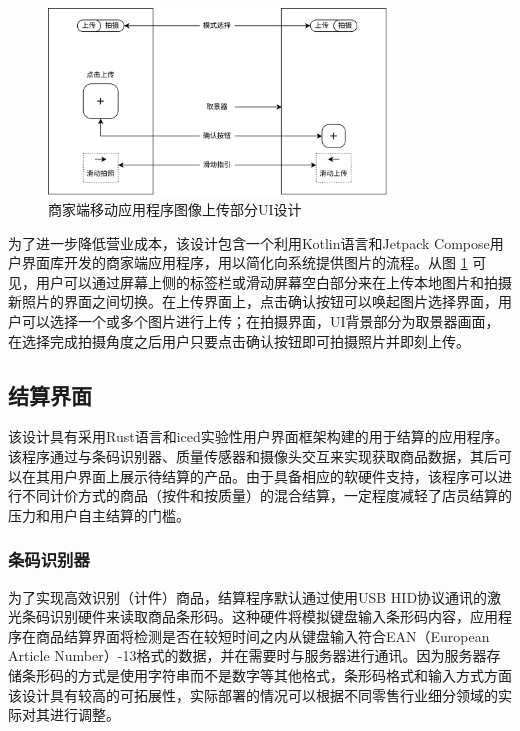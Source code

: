 \begin{figure}[htbp]
	\centering
	\includegraphics[width=0.8\textwidth]{./imgs/se-picture.png}
	\caption{商家端移动应用程序图像上传部分UI设计}
	\label{fig:se-picture}
\end{figure}

为了进一步降低营业成本，该设计包含一个利用Kotlin语言和Jetpack Compose用户界面库开发的商家端应用程序，用以简化向系统提供图片的流程。从图 \ref{fig:se-picture} 可见，用户可以通过屏幕上侧的标签栏或滑动屏幕空白部分来在上传本地图片和拍摄新照片的界面之间切换。在上传界面上，点击确认按钮可以唤起图片选择界面，用户可以选择一个或多个图片进行上传；在拍摄界面，UI背景部分为取景器画面，在选择完成拍摄角度之后用户只要点击确认按钮即可拍摄照片并即刻上传。

\subsection{结算界面}

该设计具有采用Rust语言和iced实验性用户界面框架构建的用于结算的应用程序。该程序通过与条码识别器、质量传感器和摄像头交互来实现获取商品数据，其后可以在其用户界面上展示待结算的产品。由于具备相应的软硬件支持，该程序可以进行不同计价方式的商品（按件和按质量）的混合结算，一定程度减轻了店员结算的压力和用户自主结算的门槛。

\subsubsection{条码识别器}

为了实现高效识别（计件）商品，结算程序默认通过使用USB HID协议通讯的激光条码识别硬件来读取商品条形码。这种硬件将模拟键盘输入条形码内容，应用程序在商品结算界面将检测是否在较短时间之内从键盘输入符合EAN（European Article Number）-13格式的数据，并在需要时与服务器进行通讯。因为服务器存储条形码的方式是使用字符串而不是数字等其他格式，条形码格式和输入方式方面该设计具有较高的可拓展性，实际部署的情况可以根据不同零售行业细分领域的实际对其进行调整。

